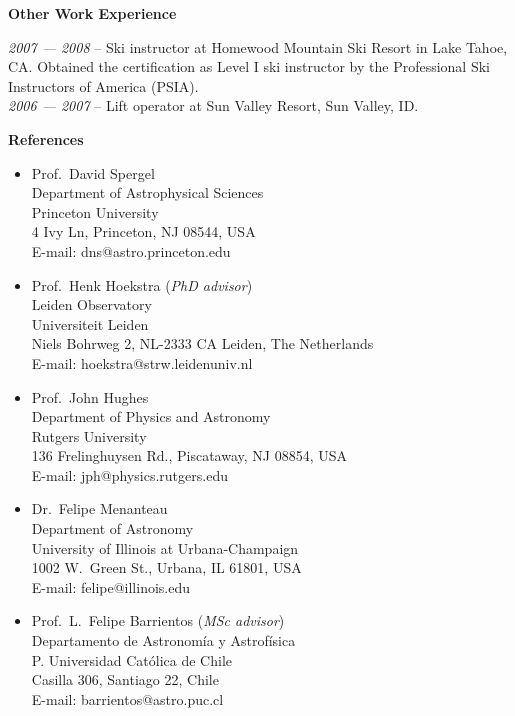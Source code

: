 \documentclass[11pt]{article}
\newcommand\sectitle[1]{
  \vspace{0.5cm}
  \noindent
  \textbf{\large #1}\\
  \vspace{-0.2cm}
}
\begin{document}
\sectitle{Other Work Experience}

\noindent
\emph{2007 --- 2008} -- Ski instructor at Homewood Mountain Ski Resort in Lake Tahoe, CA. Obtained the certification as Level I ski instructor  by the Professional Ski Instructors of America (PSIA).\\
\emph{2006 --- 2007} -- Lift operator at Sun Valley Resort, Sun Valley, ID.

\vspace{1cm}
\hline
\vspace{1cm}

\noindent
{\bf\Large References}
\begin{itemize}
 \item Prof.~David Spergel\\
       Department of Astrophysical Sciences\\
       Princeton University\\
       4 Ivy Ln, Princeton, NJ 08544, USA\\
       E-mail: dns@astro.princeton.edu
 \item Prof.~Henk Hoekstra (\textit{PhD advisor})\\
       Leiden Observatory\\
       Universiteit Leiden\\
       Niels Bohrweg 2, NL-2333 CA Leiden, The Netherlands\\
       E-mail: hoekstra@strw.leidenuniv.nl
 \item Prof.~John Hughes\\
       Department of Physics and Astronomy\\
       Rutgers University\\
       136 Frelinghuysen Rd., Piscataway, NJ 08854, USA\\
       E-mail: jph@physics.rutgers.edu
 \item Dr.~Felipe Menanteau\\
       Department of Astronomy\\
       University of Illinois at Urbana-Champaign\\
       1002 W.\ Green St., Urbana, IL 61801, USA\\
       E-mail: felipe@illinois.edu
 \item Prof.~L.~Felipe Barrientos (\textit{MSc advisor})\\
       Departamento de Astronom\'ia y Astrof\'isica\\
       P. Universidad Cat\'olica de Chile\\
       Casilla 306, Santiago 22, Chile\\
       E-mail: barrientos@astro.puc.cl
\end{itemize}




% 
\end{document}
